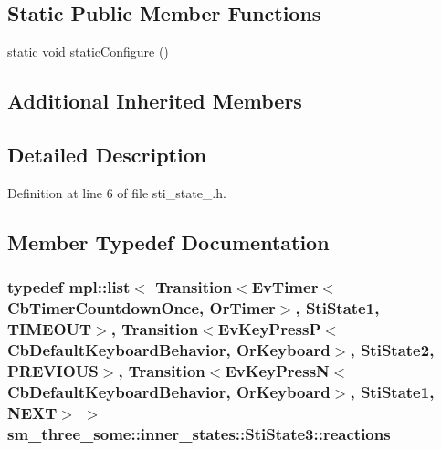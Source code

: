 \subsection*{Static Public Member Functions}
\begin{DoxyCompactItemize}
\item 
static void \hyperlink{structsm__three__some_1_1inner__states_1_1StiState3_a029d93f83c53d16ac347d908dbe87cc2}{static\+Configure} ()
\end{DoxyCompactItemize}
\subsection*{Additional Inherited Members}


\subsection{Detailed Description}


Definition at line 6 of file sti\+\_\+state\+\_.\+h.



\subsection{Member Typedef Documentation}
\subsubsection[{\texorpdfstring{reactions}{reactions}}]{\setlength{\rightskip}{0pt plus 5cm}typedef mpl\+::list$<$ Transition$<$Ev\+Timer$<$Cb\+Timer\+Countdown\+Once, {\bf Or\+Timer}$>$, {\bf Sti\+State1}, {\bf T\+I\+M\+E\+O\+UT}$>$, Transition$<$Ev\+Key\+PressP$<$Cb\+Default\+Keyboard\+Behavior, {\bf Or\+Keyboard}$>$, {\bf Sti\+State2}, {\bf P\+R\+E\+V\+I\+O\+US}$>$, Transition$<$Ev\+Key\+PressN$<$Cb\+Default\+Keyboard\+Behavior, {\bf Or\+Keyboard}$>$, {\bf Sti\+State1}, {\bf N\+E\+XT}$>$ $>$ {\bf sm\+\_\+three\+\_\+some\+::inner\+\_\+states\+::\+Sti\+State3\+::reactions}}\hypertarget{structsm__three__some_1_1inner__states_1_1StiState3_a3c00d8e30a1a01b0783e9dfcf57bfd25}{}\label{structsm__three__some_1_1inner__states_1_1StiState3_a3c00d8e30a1a01b0783e9dfcf57bfd25}


